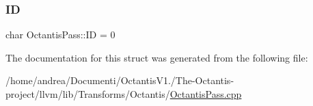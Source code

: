 \subsubsection{\texorpdfstring{ID}{ID}}
{\footnotesize\ttfamily char Octantis\+Pass\+::\+ID = 0\hspace{0.3cm}{\ttfamily [static]}}



The documentation for this struct was generated from the following file\+:\begin{DoxyCompactItemize}
\item 
/home/andrea/\+Documenti/\+Octantis\+V1./\+The-\/\+Octantis-\/project/llvm/lib/\+Transforms/\+Octantis/\hyperlink{OctantisPass_8cpp}{Octantis\+Pass.\+cpp}\end{DoxyCompactItemize}
